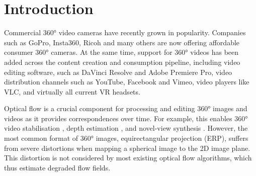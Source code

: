 \section{Introduction}
\label{sec:intro}

Commercial 360° video cameras have recently grown in popularity.
Companies such as GoPro, Insta360, Ricoh and many others are now offering affordable consumer 360° cameras.
%
At the same time, support for 360° videos has been added across the content creation and consumption pipeline, including video editing software, such as DaVinci Resolve and Adobe Premiere Pro,
video distribution channels such as YouTube, Facebook and Vimeo,
video players like VLC, and virtually all current VR headsets.


Optical flow is a crucial component for processing and editing 360° images and videos as it provides correspondences over time.
For example, this enables 360° video stabilisation \cite{Kopf2016}, depth estimation \cite{ZioulKZAD2019}, and novel-view synthesis \cite{BerteYLR2020}.
%
However, the most common format of 360° images, equirectangular projection (ERP), suffers from severe distortions when mapping a spherical image to the 2D image plane.
This distortion is not considered by most existing optical flow algorithms, which thus estimate degraded flow fields.


